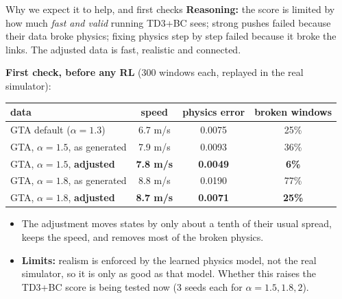 \documentclass[aspectratio=169,10pt]{beamer}
\begin{document}
\begin{frame}{Why we expect it to help, and first checks}
\textbf{Reasoning:} the score is limited by how much \emph{fast and valid} running TD3+BC sees; strong pushes failed because their data broke physics; fixing physics step by step failed because it broke the links. The adjusted data is fast, realistic and connected.
\vspace{0.4em}

\textbf{First check, before any RL} (300 windows each, replayed in the real simulator):
\vspace{0.2em}

\centering
\begin{tabular}{lccc}
\toprule
data & speed & physics error & broken windows\\
\midrule
GTA default ($\alpha = 1.3$) & 6.7 m/s & 0.0075 & 25\%\\
GTA, $\alpha = 1.5$, as generated & 7.9 m/s & 0.0093 & 36\%\\
GTA, $\alpha = 1.5$, \textbf{adjusted} & \textbf{7.8 m/s} & \textbf{0.0049} & \textbf{6\%}\\
GTA, $\alpha = 1.8$, as generated & 8.8 m/s & 0.0190 & 77\%\\
GTA, $\alpha = 1.8$, \textbf{adjusted} & \textbf{8.7 m/s} & \textbf{0.0071} & \textbf{25\%}\\
\bottomrule
\end{tabular}
\vspace{0.4em}

\raggedright
\begin{itemize}
\item The adjustment moves states by only about a tenth of their usual spread, keeps the speed, and removes most of the broken physics.
\item \textbf{Limits:} realism is enforced by the learned physics model, not the real simulator, so it is only as good as that model. Whether this raises the TD3+BC score is being tested now (3 seeds each for $\alpha = 1.5, 1.8, 2$).
\end{itemize}
\end{frame}
\end{document}
